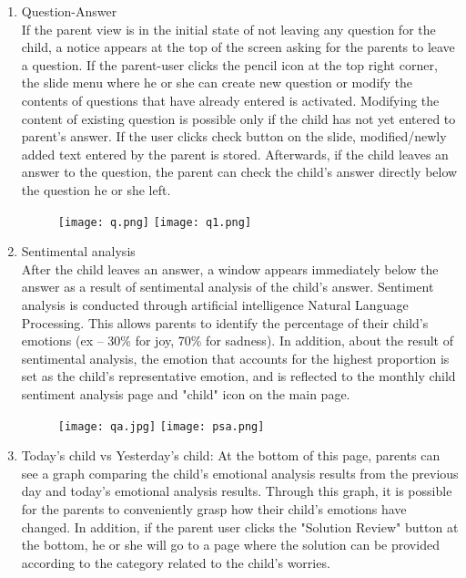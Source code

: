 \documentclass[conference]{IEEEtran}
\begin{document}
\begin{enumerate}
            \begin{enumerate}
                \item Question-Answer\\
                If the parent view is in the initial state of not leaving any question for the child, a notice appears at the top of the screen asking for the parents to leave a question. If the parent-user clicks the pencil icon at the top right corner, the slide menu where he or she can create new question or modify the contents of questions that have already entered is activated. Modifying the content of existing question is possible only if the child has not yet entered to parent's answer. If the user clicks check button on the slide, modified/newly added text entered by the parent is stored. Afterwards, if the child leaves an answer to the question, the parent can check the child's answer directly below the question he or she left.
                 \begin{figure}[H]
                 \centering
                 \texttt{[image: q.png]}
                 \texttt{[image: q1.png]}
                 \end{figure}
                \item Sentimental analysis\\
                After the child leaves an answer, a window appears immediately below the answer as a result of sentimental analysis of the child's answer. Sentiment analysis is conducted through artificial intelligence Natural Language Processing. This allows parents to identify the percentage of their child's emotions (ex – 30\% for joy, 70\% for sadness). In addition, about the result of sentimental analysis, the emotion that accounts for the highest proportion is set as the child's representative emotion, and is reflected to the monthly child sentiment analysis page and "child" icon on the main page.
                \begin{figure}[H]
                 \centering
                 \texttt{[image: qa.jpg]}
                 \texttt{[image: psa.png]}
                 \end{figure}
                \item Today's child vs Yesterday's child: At the bottom of this page, parents can see a graph comparing the child's emotional analysis results from the previous day and today's emotional analysis results. Through this graph, it is possible for the parents to conveniently grasp how their child's emotions have changed. In addition, if the parent user clicks the "Solution Review" button at the bottom, he or she will go to a page where the solution can be provided according to the category related to the child's worries.

\end{enumerate}
\end{enumerate}
\end{document}
